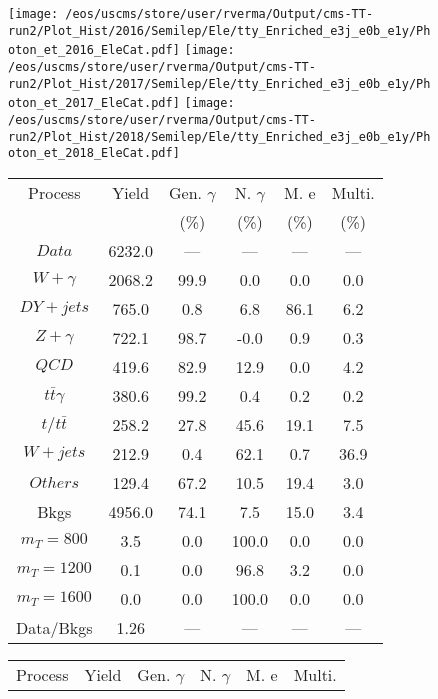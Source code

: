 \begin{figure}
\centering
\texttt{[image: /eos/uscms/store/user/rverma/Output/cms-TT-run2/Plot\_Hist/2016/Semilep/Ele/tty\_Enriched\_e3j\_e0b\_e1y/Photon\_et\_2016\_EleCat.pdf]}
\texttt{[image: /eos/uscms/store/user/rverma/Output/cms-TT-run2/Plot\_Hist/2017/Semilep/Ele/tty\_Enriched\_e3j\_e0b\_e1y/Photon\_et\_2017\_EleCat.pdf]}
\texttt{[image: /eos/uscms/store/user/rverma/Output/cms-TT-run2/Plot\_Hist/2018/Semilep/Ele/tty\_Enriched\_e3j\_e0b\_e1y/Photon\_et\_2018\_EleCat.pdf]}
\begin{minipage}[c]{0.32\textwidth}
\centering
\tiny{
\begin{tabular}{cccccc}
\hline
Process & Yield & Gen. $\gamma$ & N. $\gamma$ & M. e & Multi. \\
 &  & (\%) & (\%) & (\%) & (\%)  \\
\hline
                                                                      $ Data $ &  6232.0 &  --- &  --- &  --- &  ---\\
$ W+\gamma $ &  2068.2 &  99.9 &  0.0 &  0.0 &  0.0\\
$ DY+jets $ &  765.0 &  0.8 &  6.8 &  86.1 &  6.2\\
$ Z+\gamma $ &  722.1 &  98.7 &  -0.0 &  0.9 &  0.3\\
$ QCD $ &  419.6 &  82.9 &  12.9 &  0.0 &  4.2\\
$ t\bar{t}\gamma $ &  380.6 &  99.2 &  0.4 &  0.2 &  0.2\\
$ t/t\bar{t} $ &  258.2 &  27.8 &  45.6 &  19.1 &  7.5\\
$ W+jets $ &  212.9 &  0.4 &  62.1 &  0.7 &  36.9\\
$ Others $ &  129.4 &  67.2 &  10.5 &  19.4 &  3.0\\
Bkgs &  4956.0 &  74.1 &  7.5 &  15.0 &  3.4\\
$ m_{T} = 800 $ &  3.5 &  0.0 &  100.0 &  0.0 &  0.0\\
$ m_{T} = 1200 $ &  0.1 &  0.0 &  96.8 &  3.2 &  0.0\\
$ m_{T} = 1600 $ &  0.0 &  0.0 &  100.0 &  0.0 &  0.0\\
Data/Bkgs &  1.26 &  --- &  --- &  --- &  ---\\
\hline
\end{tabular}
}
\end{minipage}
\begin{minipage}[c]{0.32\textwidth}
\centering
\tiny{
\begin{tabular}{cccccc}
\hline
Process & Yield & Gen. $\gamma$ & N. $\gamma$ & M. e & Multi. \\

\end{tabular}}
\end{minipage}
\end{figure}
